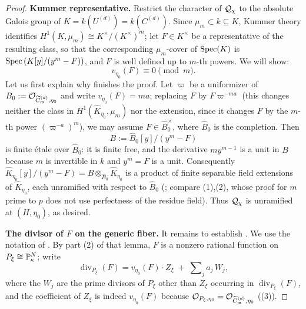 \begin{proof}
    \textbf{Kummer representative.}
    Restrict the character of $\mathcal{Q}_\chi$ to the absolute Galois group of
    $K = k(U^{(d)}) = k(C^{(d)})$. Since $\mu_m \subset k \subseteq K$, Kummer theory
    identifies $H^1(K, \mu_m) \cong K^\times/(K^\times)^m$; let $F \in K^\times$ be a
    representative of the resulting class, so that the corresponding $\mu_m$-cover of
    $\operatorname{Spec}(K)$ is $\operatorname{Spec}\left( K[y]/(y^m - F) \right)$, and $F$ is well defined up to $m$-th
    powers. We will show:
    \begin{equation}\label{equation:kummer_valuation_route_two}
        v_{\eta_0}(F) \equiv 0 \pmod{m}.
    \end{equation}
    Let us first explain why  finishes the proof.
    Let $\varpi$ be a uniformizer of $B_0 := \mathcal{O}_{\widetilde{C}_{\mathfrak{m}}^{(d)}, \eta_0}$ and write
    $v_{\eta_0}(F) = m a$; replacing $F$ by $F \varpi^{-ma}$ (this changes neither the class in
    $H^1(\widehat{K}_{\eta_0}, \mu_m)$ nor the extension, since it changes $F$ by the $m$-th
    power $\left(\varpi^{-a}\right)^m$), we may assume $F \in \widehat{B}_0^\times$, where
    $\widehat{B}_0$ is the completion. Then
    \[ B := \widehat{B}_0[y]/(y^m - F) \]
    is finite \'etale over $\widehat{B}_0$: it is finite free, and the derivative $m y^{m-1}$
    is a unit in $B$ because $m$ is invertible in $k$ and $y^m = F$ is a unit. Consequently
    $\widehat{K}_{\eta_0}[y]/(y^m - F) = B \otimes_{\widehat{B}_0} \widehat{K}_{\eta_0}$ is a
    product of finite separable field extensions of $\widehat{K}_{\eta_0}$, each unramified
    with respect to $\widehat{B}_0$ (; compare
    (1),(2), whose proof for $m$ prime to $p$ does not use
    perfectness of the residue field). Thus $\mathcal{Q}_\chi$ is unramified at $(H, \eta_0)$, as
    desired.

    \textbf{The divisor of $F$ on the generic fiber.}
    It remains to establish . We use the notation of
    . By part (2) of that lemma, $F$ is a nonzero
    rational function on $P_\xi \cong \mathbb{P}^N_\kappa$; write
    \[ \operatorname{div}_{P_\xi}(F) = v_{\eta_0}(F)\cdot Z_\xi \;+\; \sum\nolimits_j a_j\, W_j, \]
    where the $W_j$ are the prime divisors of $P_\xi$ other than $Z_\xi$ occurring in
    $\operatorname{div}_{P_\xi}(F)$, and the coefficient of $Z_\xi$ is indeed $v_{\eta_0}(F)$
    because $\mathcal{O}_{P_\xi, \eta_0} = \mathcal{O}_{\widetilde{C}_{\mathfrak{m}}^{(d)}, \eta_0}$
    ((3)).


\end{proof}

